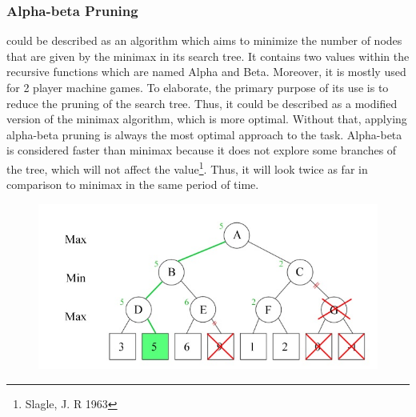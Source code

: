 \documentclass[master]{subfiles}
\begin{document}
\subsubsection{Alpha-beta Pruning}
 could be described as an algorithm which aims to minimize the number of nodes that are given by the minimax in its search tree. It contains two values within the recursive functions which are named Alpha and Beta. Moreover, it is mostly used for 2 player machine games. To elaborate, the primary purpose of its use is to reduce the pruning of the search tree. Thus, it could be described as a modified version of the minimax algorithm, which is more optimal. Without that, applying alpha-beta pruning is always the most optimal approach to the task. Alpha-beta is considered faster than minimax because it does not explore some branches of the tree, which will not affect the value\footnote{Slagle, J. R 1963}. Thus, it will look twice as far in comparison to minimax in the same period of time.
\begin{figure}
\centering
\hspace*{-20pt}
\includegraphics[width=\textwidth]{images/alphabeta.png}
\label{alphabeta}
\end{figure}
\end{document}
